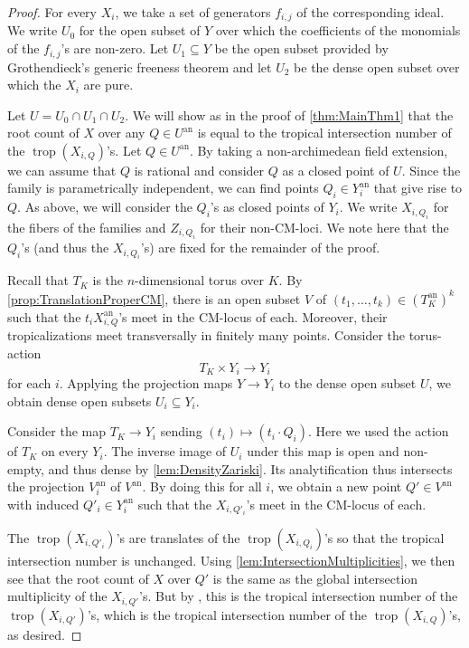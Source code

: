 \documentclass[12pt,reqno,a4paper]{amsart}
\theoremstyle{theoremstyle}
\theoremstyle{examplestyle}
\theoremstyle{algorithmstyle}
\newcommand{\an}{{\mathrm{an}}}
\DeclareMathOperator{\trop}{trop}
\begin{document}
\begin{proof}
  For every $X_{i}$, we take a set of generators $f_{i,j}$ of the corresponding ideal. We write $U_{0}$ for the open subset of $Y$ over which the coefficients of the monomials of the $f_{i,j}$'s are non-zero. Let $U_{1}\subseteq{Y}$ be the open subset provided by Grothendieck's generic freeness theorem and let $U_{2}$ be the dense open subset over which the $X_{i}$ are pure.

  Let $U=U_{0}\cap{}U_{1}\cap{U_{2}}$. We will show as in the proof of \cref{thm:MainThm1} that the root count of $X$ over any $Q\in U^{\an}$ is equal to the tropical intersection number of the $\trop(X_{i,Q})$'s.  %
  Let $Q\in U^{\an}$. %
  By taking a non-archimedean field extension, we can assume that $Q$ is rational and consider $Q$ as a closed point of $U$. Since the family is parametrically independent, we can find points $Q_{i}\in{Y^{\mathrm{an}}_{i}}$ that give rise to $Q$. As above, we will consider the $Q_{i}$'s as closed points of $Y_{i}$.
  We write $X_{i,Q_{i}}$ for the fibers of the families and $Z_{i,Q_{i}}$ for their non-CM-loci. We note here that the $Q_{i}$'s (and thus the $X_{i,Q_{i}}$'s) are fixed for the remainder of the proof.

Recall that $T_{K}$ is the $n$-dimensional torus over $K$.
  By \cref{prop:TranslationProperCM}, there is an open subset $V$ of $(t_{1},\dots,t_{k})\in(T_{K}^{\mathrm{an}})^k$ such that %
  the $t_{i}X^{\an}_{i,Q}$'s meet in the CM-locus of each. Moreover, their tropicalizations meet transversally in finitely many points.
  Consider the torus-action
  \begin{equation*}
    T_{K}\times{Y_{i}}\to{Y_{i}}
  \end{equation*}
  for each $i$. Applying the projection maps $Y\to{Y_{i}}$ to the dense open subset $U$, we obtain dense open subsets $U_{i}\subseteq{Y_{i}}$.

  Consider the map $T_{K}\to{Y_{i}}$ sending $(t_{i})\mapsto (t_{i}\cdot Q_{i})$. Here we used the action of $T_{K}$ on every $Y_{i}$.   %
  The inverse image of $U_{i}$ under this map is open and non-empty, and thus dense by \cref{lem:DensityZariski}. Its analytification thus intersects the projection $V^{\an}_{i}$ of $V^{\an}$. By doing this for all $i$, we obtain a new point $Q'\in V^{\an}$ with induced $Q'_{i}\in Y^{\an}_{i}$ such that the $X_{i,Q'_{i}}$'s meet in the CM-locus of each.

  The $\trop(X_{i,Q'_{i}})$'s are translates of the $\trop(X_{i,Q_{i}})$'s so that the tropical intersection number is unchanged.  Using \cref{lem:IntersectionMultiplicities}, we then see that the root count of $X$ over $Q'$ is the same as the global intersection multiplicity of the $X_{i,Q'}$'s. But by \cite[Corollary 6.13]{OR2013}, this is the tropical intersection number of the $\trop(X_{i,Q'})$'s, which is the tropical intersection number of the $\trop(X_{i,Q})$'s, as desired.  %
\end{proof}
\end{document}
